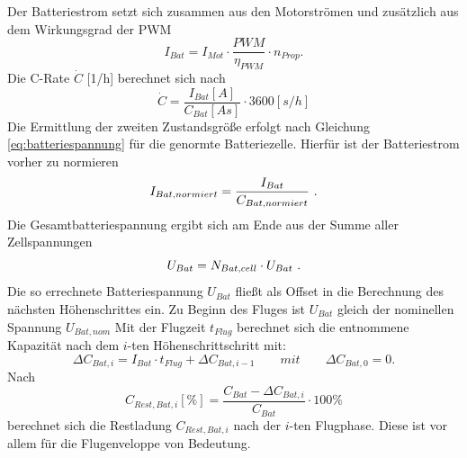 Der Batteriestrom setzt sich zusammen aus den Motorströmen und zusätzlich aus dem Wirkungsgrad der PWM
\begin{equation}
	I_{Bat} = I_{Mot}\cdot \frac{PWM}{\eta_{PWM}}\cdot n_{Prop}.  \label{eq:batteriestrom}
\end{equation}
Die C-Rate \ensuremath{\dot{C}} [1/h] berechnet sich nach 
\begin{equation}
	\dot{C} = \frac{I_{Bat}[A]}{C_{Bat}[As]}\cdot 3600[s/h]
	\label{eq:c_rate}
\end{equation}
Die Ermittlung der zweiten Zustandsgröße erfolgt nach Gleichung \ref{eq:batteriespannung} für die genormte Batteriezelle. Hierfür ist der Batteriestrom vorher zu normieren
\begin{equation}
	I_{Bat,normiert} = \frac{I_{Bat}}{C_{Bat,normiert}} ~\text{.}
\end{equation}
Die Gesamtbatteriespannung ergibt sich am Ende aus der Summe aller Zellspannungen
\begin{equation}
	U_{Bat} = N_{Bat,cell}\cdot U_{Bat} ~\text{.}
\end{equation}
Die so errechnete Batteriespannung \ensuremath{U_{Bat}} fließt als Offset in die Berechnung des nächsten Höhenschrittes ein. Zu Beginn des Fluges ist \ensuremath{U_{Bat}} gleich der nominellen Spannung \ensuremath{U_{Bat,nom}}
Mit der Flugzeit \ensuremath{t_{Flug}} berechnet sich die entnommene Kapazität nach dem \ensuremath{i}-ten Höhenschrittschritt mit: 
\begin{equation}
	\Delta C_{Bat,i} = I_{Bat}\cdot t_{Flug} + \Delta C_{Bat,i-1} 
	\qquad mit \qquad \Delta C_{Bat,0} = 0.
\end{equation}
Nach
\begin{equation}
	C_{Rest,Bat,i}[\%] = \frac{C_{Bat}-\Delta C_{Bat,i}}{C_{Bat}}\cdot 100\%
\end{equation}
berechnet sich die Restladung \ensuremath{C_{Rest,Bat,i}} nach der \ensuremath{i}-ten Flugphase. Diese ist vor allem für die Flugenveloppe von Bedeutung.\\



